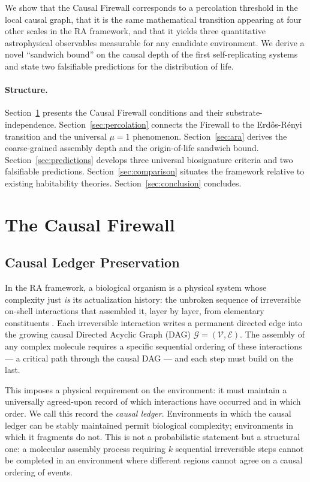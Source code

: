\documentclass[11pt,a4paper]{article}
\theoremstyle{plain}
\theoremstyle{definition}
\theoremstyle{remark}
\begin{document}
We show that the Causal Firewall corresponds to a percolation threshold in the
local causal graph, that it is the same mathematical transition appearing at
four other scales in the RA framework, and that it yields three quantitative
astrophysical observables measurable for any candidate environment. We derive
a novel ``sandwich bound'' on the causal depth of the first self-replicating
systems and state two falsifiable predictions for the distribution of life.

\paragraph{Structure.}
Section~\ref{sec:firewall} presents the Causal Firewall conditions and their
substrate-independence. Section~\ref{sec:percolation} connects the Firewall
to the Erd\H{o}s-R\'{e}nyi transition and the universal $\mu = 1$ phenomenon.
Section~\ref{sec:ara} derives the coarse-grained assembly depth and the
origin-of-life sandwich bound. Section~\ref{sec:predictions} develops three
universal biosignature criteria and two falsifiable predictions.
Section~\ref{sec:comparison} situates the framework relative to existing
habitability theories. Section~\ref{sec:conclusion} concludes.

\section{The Causal Firewall}
\label{sec:firewall}

\subsection{Causal Ledger Preservation}

In the RA framework, a biological organism is a physical system whose
complexity just \emph{is} its actualization history: the unbroken sequence
of irreversible on-shell interactions that assembled it, layer by layer,
from elementary constituents \citep{Sandeman2026RAHC}. Each irreversible
interaction writes a permanent directed edge into the growing causal Directed
Acyclic Graph (DAG) $\mathcal{G} = (\mathcal{V}, \mathcal{E})$. The assembly
of any complex molecule requires a specific sequential ordering of these
interactions --- a critical path through the causal DAG --- and each step
must build on the last.

This imposes a physical requirement on the environment: it must maintain a
universally agreed-upon record of which interactions have occurred and in
which order. We call this record the \emph{causal ledger}. Environments in
which the causal ledger can be stably maintained permit biological complexity;
environments in which it fragments do not. This is not a probabilistic
statement but a structural one: a molecular assembly process requiring $k$
sequential irreversible steps cannot be completed in an environment where
different regions cannot agree on a causal ordering of events.
\end{document}
